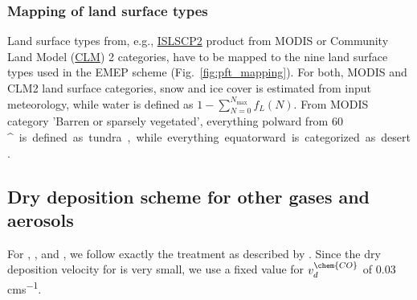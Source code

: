 \documentclass[gmd, manuscript]{copernicus}
\begin{document}
\subsubsection*{Mapping of land surface types}
Land surface types from, e.g., \href{https://daac.ornl.gov/cgi-bin/dataset_lister.pl?p=29}{ISLSCP2} product from MODIS or Community Land Model (\href{http://www.cgd.ucar.edu/tss/clm/}{CLM}) 2 categories, have to be mapped to the nine land surface types used in the EMEP scheme (Fig.~\ref{fig:pft_mapping}). For both, MODIS and CLM2 land surface categories, snow and ice cover is estimated from input meteorology, while water is defined as $1-\sum_{N=0}^{N_\text{max}} f_L(N)$. From MODIS category 'Barren or sparsely vegetated', everything polward from 60\,\unit{^\circ} is defined as tundra, while everything equatorward is categorized as desert.

\subsection{Dry deposition scheme for other gases and aerosols}
For , , and , we follow exactly the treatment as described by \citet{ACP:Simpson2012}. Since the dry deposition velocity for  is very small, we use a fixed value for $v_d^\chem{CO}$ of 0.03\,\unit{cms^{-1}}.
\end{document}
